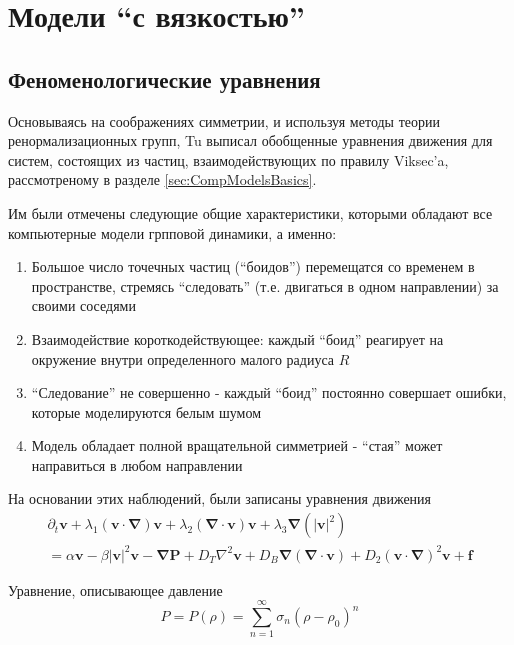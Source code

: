 \section{Модели ``с вязкостью''} %
\label{sec:ClassicalModelsWIthViscosity}
	\subsection{Феноменологические уравнения} %
	\label{sub:TonerAndTu}
		Основываясь на соображениях симметрии, и используя методы теории ренормализационных групп, Tu \cite{tu2000} выписал обобщенные уравнения движения для систем, состоящих из частиц, взаимодействующих по правилу Viksec'a, рассмотреному в разделе \ref{sec:CompModelsBasics}. 

		Им были отмечены следующие общие характеристики, которыми обладают все компьютерные модели грпповой динамики, а именно:
		\begin{enumerate}
			\item Большое число точечных частиц (``боидов'') перемещатся со временем в пространстве, стремясь ``следовать'' (т.е. двигаться в одном направлении) за своими соседями
			\item Взаимодействие короткодействующее: каждый ``боид'' реагирует на окружение внутри определенного малого радиуса $R$
			\item ``Следование'' не совершенно - каждый ``боид'' постоянно совершает ошибки, которые моделируются белым шумом
			\item Модель обладает полной вращательной симметрией - ``стая'' может направиться в любом направлении
		\end{enumerate}

		На основании этих наблюдений, были записаны уравнения движения
		\begin{multline}
		\label{eq:TuEqOfMotion}
			\partial_t \boldsymbol{v} + \lambda_1(\boldsymbol{v} \cdot \boldsymbol{\nabla})\boldsymbol{v} + \lambda_2(\boldsymbol{\nabla} \cdot \boldsymbol{v})\boldsymbol{v} + \lambda_3\boldsymbol{\nabla}(|\boldsymbol{v}|^2) \\ = \alpha \boldsymbol{v} - \beta |\boldsymbol{v}|^2 \boldsymbol{v} - \boldsymbol{\nabla} \boldsymbol{P} + D_T \nabla^2 \boldsymbol{v} + D_B \boldsymbol{\nabla}(\boldsymbol{\nabla} \cdot \boldsymbol{v}) + D_2(\boldsymbol{v} \cdot \boldsymbol{\nabla})^2 \boldsymbol{v}+\boldsymbol{f}
		\end{multline}

		Уравнение, описывающее давление
		\begin{equation}
		\label{eq:TuEqOfPressure}
			P = P(\rho) = \sum_{n=1}^\infty \sigma_n(\rho - \rho_0)^n
		\end{equation}

